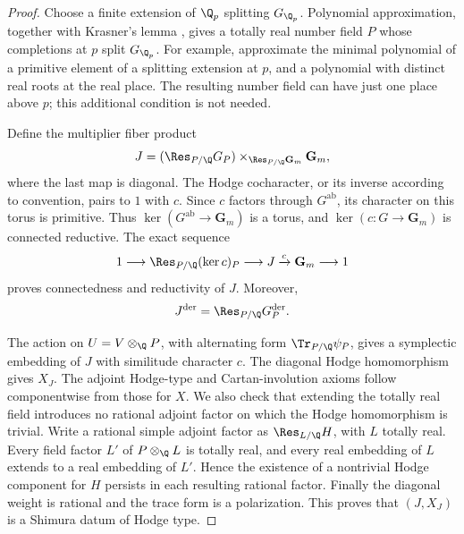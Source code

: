 \begin{proof}
Choose a finite extension of $\Q_p$ splitting $G_{\Q_p}$.  Polynomial
approximation, together with Krasner's lemma
\cite[Propositions~7.60--7.61 and Corollary~7.62]{MilneANT}, gives a
totally real number field $P$ whose completions at $p$ split $G_{\Q_p}$.  For
example, approximate the minimal polynomial of a primitive element
of a splitting extension at $p$, and a polynomial with distinct real
roots at the real place.  The resulting number field can have just
one place above $p$; this additional condition is not needed.

Define the multiplier fiber product
\begin{equation}
 J=(\Res_{P/\Q}G_P)
       \mathbin{\times}_{\Res_{P/\Q}\mathbf G_m}\mathbf G_m,
 \label{eq:equal-multiplier-group}
\end{equation}
where the last map is diagonal.  The Hodge cocharacter, or its
inverse according to convention, pairs to $1$ with $c$.  Since $c$
factors through $G^{\mathrm{ab}}$, its character on this torus is
primitive.  Thus $\ker(G^{\mathrm{ab}}\to\mathbf G_m)$ is a torus,
and $\ker(c:G\to\mathbf G_m)$ is connected reductive.  The exact
sequence
\[
 1\longrightarrow\Res_{P/\Q}(\ker c)_P
 \longrightarrow J\xrightarrow{c}\mathbf G_m\longrightarrow1
\]
proves connectedness and reductivity of $J$.  Moreover,
\begin{equation}
 J^{\mathrm{der}}=\Res_{P/\Q}G_P^{\mathrm{der}}.
 \label{eq:auxiliary-derived}
\end{equation}

The action on $U=V\otimes_\Q P$, with alternating form
$\Tr_{P/\Q}\psi_P$, gives a symplectic embedding of $J$ with
similitude character $c$.  The diagonal Hodge homomorphism gives
$X_J$.  The adjoint Hodge-type and Cartan-involution axioms follow
componentwise from those for $X$.  We also check that extending the
totally real field introduces no rational adjoint factor on which
the Hodge homomorphism is trivial.  Write a rational simple adjoint
factor as $\Res_{L/\Q}H$, with $L$ totally real.  Every field factor
$L'$ of $P\otimes_\Q L$ is totally real, and every real embedding of
$L$ extends to a real embedding of $L'$.  Hence the existence of a
nontrivial Hodge component for $H$ persists in each resulting
rational factor.  Finally the diagonal weight is rational and the
trace form is a polarization.  This proves that $(J,X_J)$ is a
Shimura datum of Hodge type.


\end{proof}
